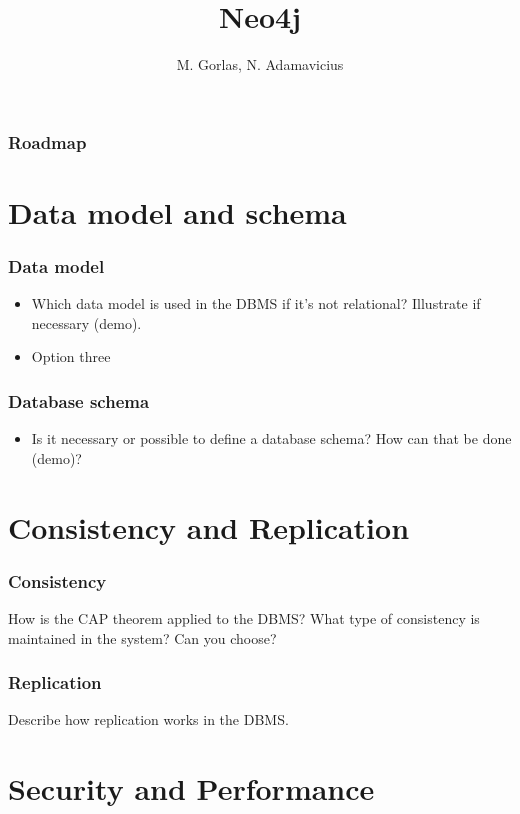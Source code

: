 \documentclass[aspectratio=169]{beamer}
\title{Neo4j}
\institute{FHTenL}
\author{M. Gorlas, N. Adamavicius}
\begin{document}
\begin{titleframe}
    \titlepage
\end{titleframe}

\begin{frame}
    \frametitle{Roadmap}
    \tableofcontents
\end{frame}

\section{Data model and schema}
\begin{frame}
    \frametitle{Data model}

    \begin{itemize}
        \item Which data model is used in the DBMS if it’s not relational? Illustrate if necessary (demo).  %
        \item Option three
    \end{itemize}

\end{frame}

\begin{frame}
    \frametitle{Database schema}

    \begin{itemize}
        \item Is it necessary or possible to define a database schema? How can that be done (demo)?
    \end{itemize}
\end{frame}

\section{Consistency and Replication}
\begin{frame}
    \frametitle{Consistency}
    
    How is the CAP theorem applied to the DBMS? What type of consistency
is maintained in the system? Can you choose?

\end{frame}

\begin{frame}
    \frametitle{Replication}

    Describe how replication works in the DBMS.
\end{frame}

\section{Security and Performance}
\end{document}
